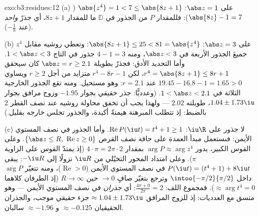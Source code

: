 \begin{solution}{exo:b3:residues:12}
(a) على $\abs z = 1$: $\abs{z^4} = 1 < 7 \leq \abs{8z + 1}$ ($\abs{8z} - 1 = 7$): فللمقدار $P$ من الجذور في
$\mathbb D$ ما للمقدار $8z + 1$، أي جذرٌ \emph{واحد} (عند
$-\frac18$).

(b) على $\abs z = 3$: $\abs{8z + 1} \leq 25 < 81 =
\abs{z^4}$: وتعطي روشيه مقابل $z^4$ جميعَ
الجذور الأربعة في $\abs z < 3$، ومنه $4 - 1 = 3$ جذور في التاج
$1 <
\abs z < 3$. وأما التحديد الأدق: فجذرٌ بطويلة $\abs z = r \geq 2.1$ كان سيحقق
$r^4 = \abs{8z + 1} \leq 8r + 1$، لكن $r^4 -
8r - 1$ متزايد من أجل $r \geq 2$ ويساوي $19.45 -
16.8 - 1 = 1.65 > 0$
عند $r = 2.1$: وهو مستحيل. ومنه تقع الجذور الخارجية الثلاثة في
$1 < \abs z < 2.1$. (وعدديًّا: جذر حقيقي بجوار $-1.95$ وزوج مرافق بجوار
$1.04 \pm
1.73\iu$، طويلته $2.02$ --- ولهذا يجب أن تخفق محاولة روشيه عند
نصف القطر $2$ بالضبط: إذ تتطلب المبرهنة هيمنةً أكيدة، والجذور
تجلس خارجه بقليل.)

(c) لا جذور على $\iu\R$: $\operatorname{Re}P(\iu t) = t^4 +
1 \geq 1$. وأما الجذور في نصف المستوي
الأيمن: فنستعمل مبدأ العمدة على حافة نصف القرص $\{\abs z \leq
R,\ \operatorname{Re}z \geq 0\}$. وعلى
القوس الكبير، يدور $\arg P
\approx \arg z^4$ بمقدار $4\cdot\pi = 2\pi\cdot2$ (إذ يمتدّ القوس على
الزاوية $\pi$). وعلى امتداد المحور التخيّلي من $\iu R$ نزولًا
إلى $-\iu R$: يبقى $P(\iu t) = (t^4 + 1) + 8\iu t$ في نصف المستوي الأيمن ($\operatorname{Re} > 0$)، ومنه
تتغيّر $\arg P$ داخل $\intoo{-\pi/2}{\pi/2}$ وترجع بتغيّر صافٍ $\to 0$ حين
$R \to \infty$ (إذ الطرفان كلاهما $\approx \arg t^4 = 0$). فمجموع اللف:
$\frac{4\pi + 0}
{2\pi} = 2$: أي \emph{جذران} في نصف المستوي الأيمن --- وهو متسق مع
العدديات: إذ للزوج المرافق $\approx
1.04 \pm 1.73\iu$ جزء حقيقي موجب، والجذران
الحقيقيان $\approx -0.125$ و $\approx -1.96$ سالبان.
\end{solution}

